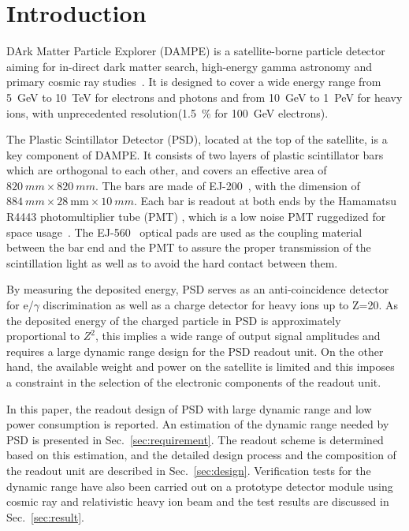 \documentclass[preprint, times]{elsarticle}
\begin{document}
\section{Introduction}
\label{sec:introduction}

DArk Matter Particle Explorer (DAMPE) is a satellite-borne particle
detector aiming for in-direct dark matter search, high-energy gamma
astronomy and primary cosmic ray studies~\cite{Chang_Jin_dampe}. It is
designed to cover a wide energy range from \SI{5}{GeV} to
\SI{10}{TeV} for electrons and photons and from \SI{10}{GeV} to
\SI{1}{PeV} for heavy ions, with unprecedented
resolution(\SI{1.5}{\percent} for \SI{100}{\giga\electronvolt} electrons).

The Plastic Scintillator Detector (PSD), located at the top of the satellite, is a key component of DAMPE. 
It consists of two layers of plastic scintillator bars which are orthogonal to each other, and covers an effective area of
$\SI{820}{mm}\times\SI{820}{mm}$. 
The bars are made of EJ-200~\cite{scintillator}, with the dimension of $\SI{884}{mm} \times \SI{28}{\milli\meter} \times \SI{10}{mm}$.
Each bar  is readout at both ends by the Hamamatsu R4443 photomultiplier tube (PMT) , which is a low noise PMT ruggedized for space usage~\cite{r4443}. 
The EJ-560~\cite{scintillator} optical pads are used as the  coupling material between the bar end and the PMT to assure the proper transmission of the scintillation light as well as to avoid the hard contact between them.

By measuring the deposited energy, PSD serves as an anti-coincidence detector for e/$\gamma$ discrimination as well as a charge detector for heavy ions up to Z=20.
As the deposited energy of the charged particle in PSD is approximately proportional to $Z^2$, this implies a wide range of output signal amplitudes and requires a large dynamic range design for the PSD readout unit.
On the other hand, the available weight and power on the satellite is limited and this imposes a constraint in the selection of the electronic components of the readout unit.

In this paper, the readout design of PSD with large dynamic range and low power consumption is reported.
An estimation of the dynamic range needed by PSD is presented in Sec.~\ref{sec:requirement}.
The readout scheme is determined based on this estimation, and the detailed design process and the composition of the readout unit are described in Sec.~\ref{sec:design}.
Verification tests for the dynamic range have also been carried out on a prototype detector module using cosmic ray and relativistic heavy ion beam and the test results are discussed in Sec.~\ref{sec:result}.
\end{document}
